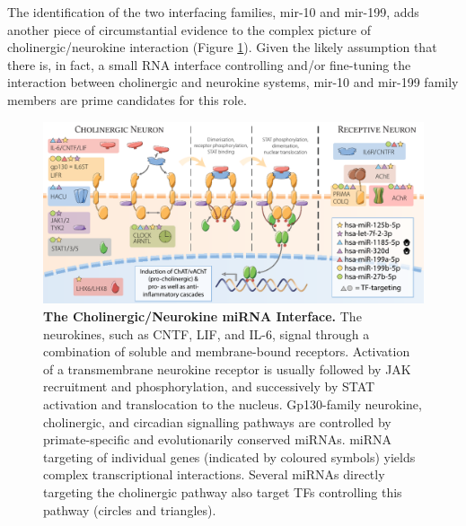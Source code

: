 The identification of the two interfacing families, mir-10 and mir-199, adds another piece of circumstantial evidence to the complex picture of cholinergic/neurokine interaction (Figure \ref{fig:neurokine}). Given the likely assumption that there is, in fact, a small RNA interface controlling and/or fine-tuning the interaction between cholinergic and neurokine systems, mir-10 and mir-199 family members are prime candidates for this role.

\begin{figure}
\includegraphics[width=\textwidth]{figures/neurokine}
\caption[The Cholinergic/Neurokine miRNA Interface.]{\textbf{The Cholinergic/Neurokine miRNA Interface.} The neurokines, such as CNTF, LIF, and IL-6, signal through a combination of soluble and membrane-bound receptors. Activation of a transmembrane neurokine receptor is usually followed by JAK recruitment and phosphorylation, and successively by STAT activation and translocation to the nucleus. Gp130-family neurokine, cholinergic, and circadian signalling pathways are controlled by primate-specific and evolutionarily conserved miRNAs. miRNA targeting of individual genes (indicated by coloured symbols) yields complex transcriptional interactions. Several miRNAs directly targeting the cholinergic pathway also target TFs controlling this pathway (circles and triangles).
\label{fig:neurokine}}
\end{figure}

